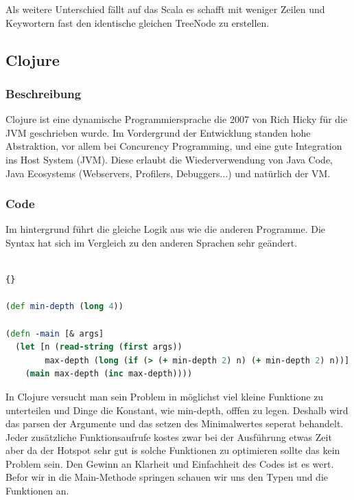 \documentclass{fancydocument}
\begin{document}
Als weitere Unterschied f\"allt auf das Scala es schafft mit weniger
Zeilen und Keywortern fast den identische gleichen TreeNode zu
erstellen.

\subsection{Clojure}
\subsubsection{Beschreibung}

Clojure ist eine dynamische Programmiersprache die 2007 von Rich Hicky
für die JVM geschrieben wurde. Im Vordergrund der Entwicklung standen
hohe Abstraktion, vor allem bei Concurency Programming, und eine gute
Integration ins Host System (JVM). Diese erlaubt die Wiederverwendung von
Java Code, Java Ecosystems (Webservers, Profilers, Debuggers...) und natürlich der VM.

\subsubsection{Code}

Im hintergrund f\"uhrt die gleiche Logik aus wie die anderen
Programme. Die Syntax hat sich im Vergleich zu den anderen Sprachen
sehr ge\"andert. 
\\\\

\begin{lstlisting}[language=Clojure,caption=Simple main]{}

(def min-depth (long 4))

(defn -main [& args]
  (let [n (read-string (first args))
        max-depth (long (if (> (+ min-depth 2) n) (+ min-depth 2) n))]
    (main max-depth (inc max-depth))))
\end{lstlisting}

In Clojure versucht man sein Problem in m\"oglichst viel kleine
Funktione zu unterteilen und Dinge die Konstant, wie min-depth, offfen
zu legen. Deshalb wird das parsen der Argumente und
das setzen des Minimalwertes seperat behandelt. Jeder zus\"atzliche
Funktionsaufrufe kostes zwar bei der Ausf\"uhrung etwas Zeit aber da
der Hotspot sehr gut is solche Funktionen zu optimieren sollte das
kein Problem sein. Den Gewinn an Klarheit und Einfachheit des Codes
ist es wert.\\
\newline
Befor wir in die Main-Methode springen schauen wir uns den Typen und
die Funktionen an.
\end{document}
